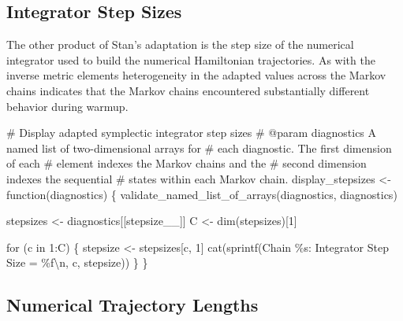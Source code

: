 \documentclass[
  letterpaper,
  DIV=11,
  numbers=noendperiod]{scrartcl}
\newenvironment{Shaded}{\begin{snugshade}}{\end{snugshade}}
\newcommand{\CharTok}[1]{\textcolor[rgb]{0.13,0.47,0.30}{#1}}
\newcommand{\CommentTok}[1]{\textcolor[rgb]{0.37,0.37,0.37}{#1}}
\newcommand{\ControlFlowTok}[1]{\textcolor[rgb]{0.00,0.23,0.31}{#1}}
\newcommand{\DecValTok}[1]{\textcolor[rgb]{0.68,0.00,0.00}{#1}}
\newcommand{\KeywordTok}[1]{\textcolor[rgb]{0.00,0.23,0.31}{#1}}
\newcommand{\NormalTok}[1]{\textcolor[rgb]{0.00,0.23,0.31}{#1}}
\newcommand{\OperatorTok}[1]{\textcolor[rgb]{0.37,0.37,0.37}{#1}}
\newcommand{\SpecialCharTok}[1]{\textcolor[rgb]{0.37,0.37,0.37}{#1}}
\newcommand{\StringTok}[1]{\textcolor[rgb]{0.13,0.47,0.30}{#1}}
\begin{document}
\subsection{Integrator Step Sizes}\label{integrator-step-sizes}

The other product of Stan's adaptation is the step size of the numerical
integrator used to build the numerical Hamiltonian trajectories. As with
the inverse metric elements heterogeneity in the adapted values across
the Markov chains indicates that the Markov chains encountered
substantially different behavior during warmup.

\begin{Shaded}
\begin{Highlighting}[]
\CommentTok{\# Display adapted symplectic integrator step sizes}
\CommentTok{\# @param diagnostics A named list of two{-}dimensional arrays for }
\CommentTok{\#                    each diagnostic.  The first dimension of each}
\CommentTok{\#                    element indexes the Markov chains and the }
\CommentTok{\#                    second dimension indexes the sequential }
\CommentTok{\#                    states within each Markov chain.}
\NormalTok{display\_stepsizes }\OperatorTok{\textless{}{-}}\NormalTok{ function(diagnostics) \{}
\NormalTok{  validate\_named\_list\_of\_arrays(diagnostics, }\StringTok{\textquotesingle{}diagnostics\textquotesingle{}}\NormalTok{)}
  
\NormalTok{  stepsizes }\OperatorTok{\textless{}{-}}\NormalTok{ diagnostics[[}\StringTok{\textquotesingle{}stepsize\_\_\textquotesingle{}}\NormalTok{]]}
\NormalTok{  C }\OperatorTok{\textless{}{-}}\NormalTok{ dim(stepsizes)[}\DecValTok{1}\NormalTok{]}
  
  \ControlFlowTok{for}\NormalTok{ (c }\KeywordTok{in} \DecValTok{1}\NormalTok{:C) \{}
\NormalTok{    stepsize }\OperatorTok{\textless{}{-}}\NormalTok{ stepsizes[c, }\DecValTok{1}\NormalTok{]}
\NormalTok{    cat(sprintf(}\StringTok{\textquotesingle{}Chain }\SpecialCharTok{\%s}\StringTok{: Integrator Step Size = }\SpecialCharTok{\%f}\CharTok{\textbackslash{}n}\StringTok{\textquotesingle{}}\NormalTok{,}
\NormalTok{                c, stepsize))}
\NormalTok{  \}}
\NormalTok{\}}
\end{Highlighting}
\end{Shaded}

\subsection{Numerical Trajectory
Lengths}\label{numerical-trajectory-lengths}
\end{document}
